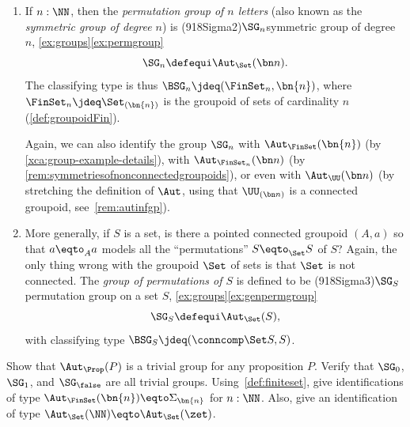 \begin{example}
\begin{enumerate}
{Issues concerning universes are nontrivial and important,
but in this text we have chosen to focus on other matters.
}
 
  \item\label{ex:permgroup}
    If $n:\NN$, then the \emph{permutation group of $n$ letters}
    (also known as the \emph{symmetric group of degree $n$}) is%
    \glossary(918Sigma2){$\protect\SG_n$}{symmetric group of degree $n$,
      \cref{ex:groups}\ref{ex:permgroup}}%
    \[
      \SG_n\defequi \Aut_{\Set}(\bn n). %
    \]
    The classifying type is thus $\BSG_n\jdeq (\FinSet_n,\bn{n})$,   
    where $\FinSet_n \jdeq \Set_{(\bn{n})}$ is the groupoid of 
    sets of cardinality $n$ (\cf \ref{def:groupoidFin}).
    
    Again, we can also identify the group $\SG_n$ with
    $\Aut_\FinSet(\bn{n})$ (by \cref{xca:group-example-details}), with 
    $\Aut_{\FinSet_n}(\bn n)$ (by \cref{rem:symmetriesofnonconnectedgroupoids}),
    or even with $\Aut_{\UU}(\bn n)$ (by stretching the definition of $\Aut$,
    using that $\UU_{(\bn n)}$ is a connected groupoid, see~\cref{rem:autinfgp}).



  \item\label{ex:genpermgroup}
    More generally, if $S$ is a set, is there a pointed connected groupoid $(A,a)$ so that $a\eqto_Aa$ models all the ``permutations'' $S\eqto_{\Set}S$ of $S$?
    Again, the only thing wrong with the groupoid $\Set$ of sets
    is that $\Set$ is not connected.
    The \emph{group of permutations of $S$} is defined to be%
    \glossary(918Sigma3){$\protect\SG_S$}{permutation group on a set $S$,
      \cref{ex:groups}\ref{ex:genpermgroup}}%
    \[
      \SG_S\defequi \Aut_{\Set}(S),
    \]
    with classifying type $\BSG_S\jdeq(\conncomp \Set S,S)$.\qedhere
  \end{enumerate}
\end{example}

\begin{xca}
  \label{xca:group-example-details}
  Show that $\Aut_\Prop(P)$ is a trivial group for any proposition $P$.
  Verify that $\SG_0$, $\SG_1$, and $\SG_\false$ are all trivial groups.
  Using~\cref{def:finiteset}, give identifications of type 
  $\Aut_\FinSet(\bn{n})\eqto\Sigma_{\bn{n}}$ for $n:\NN$.
  Also, give an identification of type $\Aut_\Set(\NN)\eqto\Aut_\Set(\zet)$. 
\end{xca}


